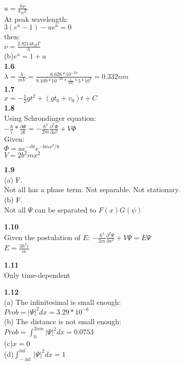 \documentclass{article}
\begin{document}
$u = \frac{h\nu}{k_BT}$\\
At peak wavelength:\\
$3(e^u - 1) - ue^u = 0$\\
then:\\
$\nu = \frac{2.8214k_BT}{h}$\\
(b)$e^u = 1+u$\\
\newline
\textbf{1.6}\\
$\lambda = \frac{h}{mV} = \frac{6.626*10^{-34}}{9.109*10^{-28}*\frac{1}{137}*3*10^8} = 0.332nm$\\
\newline
\textbf{1.7}\\
$x = -\frac{1}{2}gt^2+(gt_0+v_0)t+C$\\
\newline
\textbf{1.8}\\
Using Schrondinger equation:\\
$-\frac{\hbar}{i}*\frac{\partial\Phi}{\partial t} = -\frac{\hbar^2}{2m}\frac{\partial^2\Phi}{\partial x^2}+V\Phi$\\
Given:\\
$\Phi = ae^{-ibt}e^{-bmx^2/\hbar}$\\
$V = 2b^2mx^2$\\
\newline

\textbf{1.9}\\
(a) F.\\
Not all has a phase term. Not separable. Not stationary.\\
(b) F.\\
Not all $\Psi$ can be separated to $F(x)G(\psi)$\\
\newline

\textbf{1.10}\\
Given the postulation of $E$:
$-\frac{\hbar^2}{2m}\frac{\partial^2\Psi}{\partial x^2}+ V\Psi = E\Psi$\\
$E = \frac{3\hbar^2c}{m}$\\
\newline

\textbf{1.11}\\
Only time-dependent\\
\newline

\textbf{1.12}\\
(a) The infinitesimal is small enough:\\
$Prob = |\Psi|^2dx = 3.29*10^{-6}$\\
(b) The distance is not small enough:\\
$Prob = \int_{0}^{2nm}|\Psi|^2dx = 0.0753$\\
(c)$x = 0$\\
(d)$\int_{-\inf}^{\inf}|\Psi|^2dx = 1$\\
\newline
\end{document}
